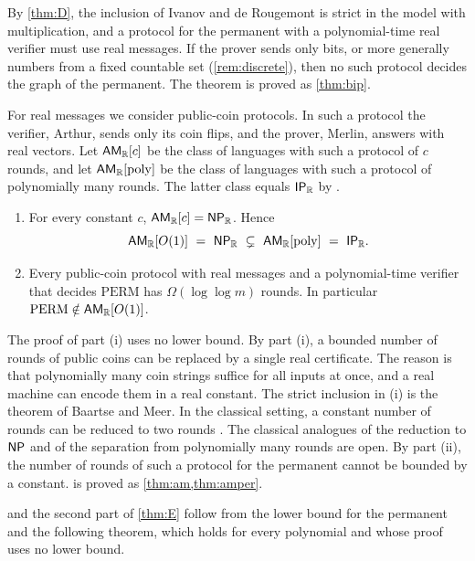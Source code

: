 By \cref{thm:D}, the inclusion of Ivanov and de Rougemont is strict in the model with multiplication, and a protocol for the permanent with a polynomial-time real verifier must use real messages. If the prover sends only bits, or more generally numbers from a fixed countable set (\cref{rem:discrete}), then no such protocol decides the graph of the permanent. The theorem is proved as \cref{thm:bip}.

For real messages we consider public-coin protocols. In such a protocol the verifier, Arthur, sends only its coin flips, and the prover, Merlin, answers with real vectors. Let $\textsf{\upshape AM}_{\mathbb{R}}[c]$ be the class of languages with such a protocol of $c$ rounds, and let $\textsf{\upshape AM}_{\mathbb{R}}[\mathrm{poly}]$ be the class of languages with such a protocol of polynomially many rounds. The latter class equals $\textsf{\upshape IP}_{\mathbb{R}}$ by \cite{BM16}.

\begin{maintheorem}\label{thm:E}
\begin{enumerate}[label=\textup{(\roman*)}]
\item For every constant $c$, $\textsf{\upshape AM}_{\mathbb{R}}[c]=\textsf{\upshape NP}_{\mathbb{R}}$. Hence
\[
\AMR[O(1)]\ =\ \NPR\ \subsetneq\ \AMR[\mathrm{poly}]\ =\ \IPR .
\]
\item Every public-coin protocol with real messages and a polynomial-time verifier that decides $\mathrm{PERM}$ has $\Omega(\log\log m)$ rounds. In particular $\mathrm{PERM}\notin\textsf{\upshape AM}_{\mathbb{R}}[O(1)]$.
\end{enumerate}
\end{maintheorem}

The proof of part (i) uses no lower bound. By part (i), a bounded number of rounds of public coins can be replaced by a single real certificate. The reason is that polynomially many coin strings suffice for all inputs at once, and a real machine can encode them in a real constant. The strict inclusion in (i) is the theorem of Baartse and Meer. In the classical setting, a constant number of rounds can be reduced to two rounds \cite{BM88}. The classical analogues of the reduction to $\textsf{\upshape NP}$ and of the separation from polynomially many rounds are open. By part (ii), the number of rounds of such a protocol for the permanent cannot be bounded by a constant.  is proved as \cref{thm:am,thm:amper}.

 and the second part of \cref{thm:E} follow from the lower bound for the permanent and the following theorem, which holds for every polynomial and whose proof uses no lower bound.

